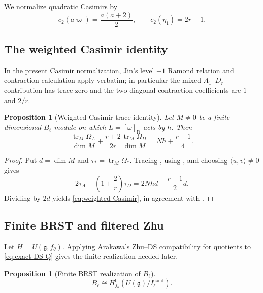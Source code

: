 \documentclass[11pt]{amsart}
\newtheorem{proposition}[theorem]{Proposition}
\theoremstyle{remark}
\numberwithin{equation}{section}
\begin{document}
We normalize quadratic Casimirs by
\[
   c_2(a\varpi)=\frac{a(a+2)}2,
   \qquad
   c_2(\eta_1)=2r-1.
\]

\subsection{The weighted Casimir identity}

In the present Casimir normalization, Jin's level \(-1\) Ramond
relation \cite[Equation~(27)]{Jin2026} and contraction calculation
\cite[Lemma~3.11]{Jin2026} apply verbatim; in particular the mixed
\(A_1\)--\(D_r\) contribution has trace zero and the two diagonal
contraction coefficients are \(1\) and \(2/r\).

\begin{proposition}[Weighted Casimir trace identity]
Let \(M\ne0\) be a finite-dimensional \(B_\ell\)-module on which
\(L=[\omega]_{\mathrm R}\) acts by \(h\).  Then
\begin{equation}
\label{eq:weighted-Casimir}
   \frac{\operatorname{tr}_M\Omega_A}{\dim M}
   +
   \frac{r+2}{2r}
   \frac{\operatorname{tr}_M\Omega_D}{\dim M}
   =
   Nh+\frac{r-1}{4}.
\end{equation}
\end{proposition}

\begin{proof}
Put \(d=\dim M\) and \(\tau_*=\operatorname{tr}_M\Omega_*\).  Tracing
\cite[Equation~(27)]{Jin2026}, using
\cite[Lemma~3.11]{Jin2026}, and choosing
\(\langle u,v\rangle\ne0\) gives
\[
   2\tau_A+\left(1+\frac2r\right)\tau_D
   =2Nhd+\frac{r-1}{2}d.
\]
Dividing by \(2d\) yields \eqref{eq:weighted-Casimir}, in agreement with
\cite[Proposition~3.12]{Jin2026}.
\end{proof}

\subsection{Finite BRST and filtered Zhu}

Let \(H=U(\mathfrak g,f_\theta)\).  Applying Arakawa's Zhu--DS
compatibility for quotients \cite[Theorems~8.1 and~8.5]{Arakawa2015} to
\eqref{eq:exact-DS-Q} gives the finite realization needed later.

\begin{proposition}[Finite BRST realization of \(B_\ell\)]
\label{prop:B-finite-BRST}
\begin{equation}
   B_\ell
   \cong
   H^0_{f_\theta}
   \!\left(U(\mathfrak g)/I_\ell^{\mathrm{cand}}\right).
\end{equation}
\end{proposition}
\end{document}
